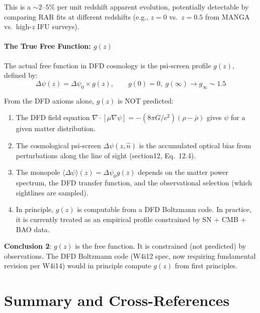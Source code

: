\documentclass[11pt,a4paper]{article}
\newcounter{findingctr}
\newenvironment{finding}[1][]{%
  \refstepcounter{findingctr}%
  \begin{tcolorbox}[colback=blue!3!white, colframe=blue!50!black,
    title=\textbf{Finding \thefindingctr: #1}]
}{%
  \end{tcolorbox}%
}
\newcommand{\mufd}{\mu}
\newcommand{\Dpsi}{\Delta\psi}
\begin{document}
\begin{finding}[\textbf{$a_0(z)$}: Fundamental Constant, Not a Free Function]
This is a $\sim 2$--$5\%$ per unit redshift apparent evolution,
potentially detectable by comparing RAR fits at different redshifts
(e.g., $z = 0$ vs.\ $z = 0.5$ from MANGA vs.\ high-$z$ IFU surveys).

\subsection*{The True Free Function: $g(z)$}

The actual free function in DFD cosmology is the psi-screen profile
$g(z)$, defined by:
\begin{equation}
\Dpsi(z) = \Dpsi_0 \times g(z), \qquad g(0) = 0,\; g(\infty) \to g_\infty \sim 1.5
\end{equation}

From the DFD axioms alone, $g(z)$ is NOT predicted:
\begin{enumerate}[nosep]
\item The DFD field equation $\nabla\cdot[\mufd\nabla\psi] =
  -(8\pi G/c^2)(\rho - \bar\rho)$ gives $\psi$ for a given
  matter distribution.
\item The cosmological psi-screen $\Dpsi(z,\hat n)$ is the accumulated
  optical bias from perturbations along the line of sight
  (section12, Eq.~12.4).
\item The monopole $\langle\Dpsi\rangle(z) = \Dpsi_0 g(z)$ depends on
  the matter power spectrum, the DFD transfer function, and the
  observational selection (which sightlines are sampled).
\item In principle, $g(z)$ is computable from a DFD Boltzmann code.
  In practice, it is currently treated as an empirical profile
  constrained by SN + CMB + BAO data.
\end{enumerate}

\textbf{Conclusion 2}: $g(z)$ is the free function.  It is constrained
(not predicted) by observations.  The DFD Boltzmann code (W4i12 spec,
now requiring fundamental revision per W4i14) would in principle
compute $g(z)$ from first principles.

\end{finding}


\part{Summary and Cross-References}
\label{part:summary}
\end{document}
